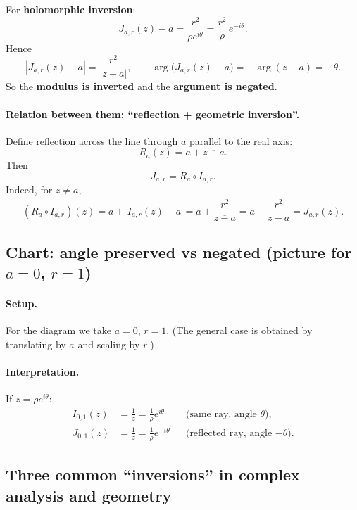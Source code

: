 \begin{problem}[CP-IV-0069]
\label{prob:cp-iv-0069}
\par\noindent\textbullet\quad For \textbf{holomorphic inversion}:
	\[
	J_{a,r}(z)-a=\frac{r^{2}}{\rho e^{i\theta}}
	=\frac{r^{2}}{\rho}\,e^{-i\theta}.
	\]
	Hence
	\[
	|J_{a,r}(z)-a|=\frac{r^{2}}{|z-a|},\qquad
	\arg\bigl(J_{a,r}(z)-a\bigr)=-\arg(z-a)=-\theta.
	\]
	So the \textbf{modulus is inverted} and the \textbf{argument is negated}.

\paragraph{\textbf{Relation between them: “reflection + geometric inversion”.}}
Define reflection across the line through $a$ parallel to the real axis:
\[
R_a(z)=a+\overline{z-a}.
\]
Then
\[
J_{a,r}=R_a\circ I_{a,r}.
\]
Indeed, for $z\neq a$,
\[
(R_a\circ I_{a,r})(z)
=a+\overline{\,I_{a,r}(z)-a\,}
=a+\overline{\frac{r^{2}}{\overline{z-a}}}
=a+\frac{r^{2}}{z-a}
=J_{a,r}(z).
\]

\subsection*{\textbf{Chart: angle preserved vs negated (picture for $a=0$, $r=1$)}}

\paragraph{\textbf{Setup.}}
For the diagram we take $a=0$, $r=1$. (The general case is obtained by translating by $a$ and scaling by $r$.)

\paragraph{\textbf{Interpretation.}}
If $z=\rho e^{i\theta}$:
\[
\begin{aligned}
I_{0,1}(z)&=\frac{1}{\overline{z}}=\frac{1}{\rho}e^{i\theta}
&&\text{(same ray, angle $\theta$),}\\
J_{0,1}(z)&=\frac{1}{z}=\frac{1}{\rho}e^{-i\theta}
&&\text{(reflected ray, angle $-\theta$).}
\end{aligned}
\]

\begin{center}

\end{center}

\subsection*{\textbf{Three common “inversions” in complex analysis and geometry}}


\end{problem}
